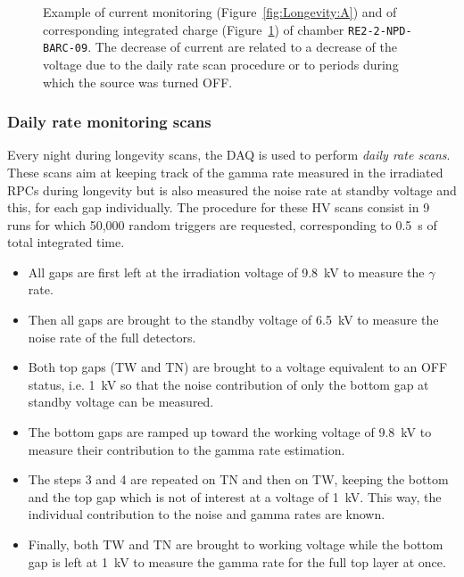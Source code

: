 \begin{figure}[H]
\begin{subfigure}{0.5\linewidth}
        	\caption{\label{fig:Longevity:B}}
    	\end{subfigure}
		\caption{\label{fig:Longevity} Example of current monitoring (Figure~\ref{fig:Longevity:A}) and of corresponding integrated charge (Figure~\ref{fig:Longevity:B}) of chamber \texttt{RE2-2-NPD-BARC-09}. The decrease of current are related to a decrease of the voltage due to the daily rate scan procedure or to periods during which the source was turned OFF.}
	\end{figure}
	
		\subsubsection{Daily rate monitoring scans}
		\label{chapt5:sssec:dailyratescan}
	
	Every night during longevity scans, the DAQ is used to perform \textit{daily rate scans}. These scans aim at keeping track of the gamma rate measured in the irradiated RPCs during longevity but is also measured the noise rate at standby voltage and this, for each gap individually. The procedure for these HV scans consist in 9 runs for which 50,000 random triggers are requested, corresponding to \SI{0.5}{s} of total integrated time.
	
	\begin{itemize}
		\item[1-] All gaps are first left at the irradiation voltage of \SI{9.8}{kV} to measure the $\gamma$ rate.
		\item[2-] Then all gaps are brought to the standby voltage of \SI{6.5}{kV} to measure the noise rate of the full detectors.
		\item[3-] Both top gaps (TW and TN) are brought to a voltage equivalent to an OFF status, i.e. \SI{1}{kV} so that the noise contribution of only the bottom gap at standby voltage can be measured.
		\item[4-] The bottom gaps are ramped up toward the working voltage of \SI{9.8}{kV} to measure their contribution to the gamma rate estimation.
		\item[5-8] The steps 3 and 4 are repeated on TN and then on TW, keeping the bottom and the top gap which is not of interest at a voltage of \SI{1}{kV}. This way, the individual contribution to the noise and gamma rates are known.
		\item[9-] Finally, both TW and TN are brought to working voltage while the bottom gap is left at \SI{1}{kV} to measure the gamma rate for the full top layer at once.
	\end{itemize}
	
